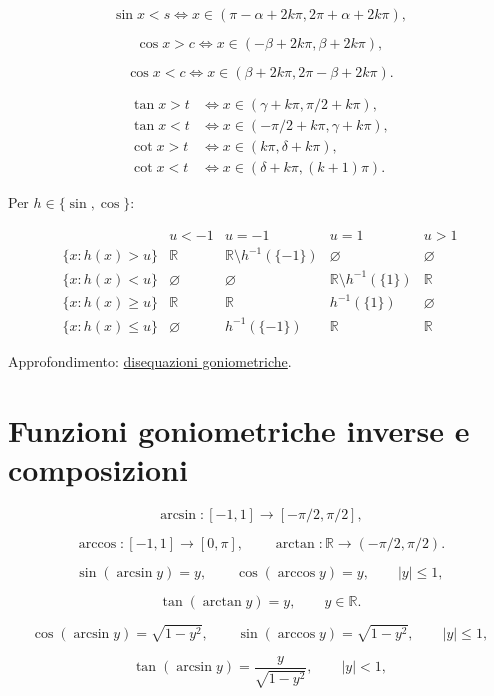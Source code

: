 \[
\sin x<s
\Longleftrightarrow
x\in(\pi-\alpha+2k\pi,2\pi+\alpha+2k\pi),
\]

\[
\cos x>c
\Longleftrightarrow
x\in(-\beta+2k\pi,\beta+2k\pi),
\]

\[
\cos x<c
\Longleftrightarrow
x\in(\beta+2k\pi,2\pi-\beta+2k\pi).
\]

\[
\begin{aligned}
\tan x>t
&\Longleftrightarrow
x\in(\gamma+k\pi,\pi/2+k\pi),\\
\tan x<t
&\Longleftrightarrow
x\in(-\pi/2+k\pi,\gamma+k\pi),\\
\cot x>t
&\Longleftrightarrow
x\in(k\pi,\delta+k\pi),\\
\cot x<t
&\Longleftrightarrow
x\in(\delta+k\pi,(k+1)\pi).
\end{aligned}
\]

Per \(h\in\{\sin,\cos\}\):

\[
\begin{array}{c|cccc}
&u<-1&u=-1&u=1&u>1\\
\hline
\{x:h(x)>u\}&\mathbb R&\mathbb R\setminus h^{-1}(\{-1\})&\varnothing&\varnothing\\
\{x:h(x)<u\}&\varnothing&\varnothing&\mathbb R\setminus h^{-1}(\{1\})&\mathbb R\\
\{x:h(x)\ge u\}&\mathbb R&\mathbb R&h^{-1}(\{1\})&\varnothing\\
\{x:h(x)\le u\}&\varnothing&h^{-1}(\{-1\})&\mathbb R&\mathbb R
\end{array}
\]

Approfondimento: \href{https://ingegnerismo.it/matematica/disequazioni-goniometriche/}{disequazioni goniometriche}.

\section{Funzioni goniometriche inverse e composizioni}\label{funzioni-goniometriche-inverse-e-composizioni}

\[
\arcsin:[-1,1]\to[-\pi/2,\pi/2],
\]

\[
\arccos:[-1,1]\to[0,\pi],
\qquad
\arctan:\mathbb R\to(-\pi/2,\pi/2).
\]

\[
\sin(\arcsin y)=y,
\qquad
\cos(\arccos y)=y,
\qquad |y|\le1,
\]

\[
\tan(\arctan y)=y,
\qquad y\in\mathbb R.
\]

\[
\cos(\arcsin y)=\sqrt{1-y^2},
\qquad
\sin(\arccos y)=\sqrt{1-y^2},
\qquad |y|\le1,
\]

\[
\tan(\arcsin y)=\frac{y}{\sqrt{1-y^2}},
\qquad |y|<1,
\]

